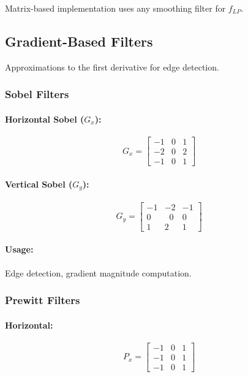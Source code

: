 \documentclass{AnantDocumentation}
\begin{document}
Matrix-based implementation uses any smoothing filter for $f_{LP}$.

\subsection{Gradient-Based Filters}

Approximations to the first derivative for edge detection.

\subsubsection{Sobel Filters}

\paragraph{Horizontal Sobel ($G_x$):}
\[
G_x =
\begin{bmatrix}
-1 & 0 & 1\\
-2 & 0 & 2\\
-1 & 0 & 1
\end{bmatrix}
\]

\paragraph{Vertical Sobel ($G_y$):}
\[
G_y =
\begin{bmatrix}
-1 & -2 & -1\\
0 & \;\;0 & 0\\
1 & 2 & 1
\end{bmatrix}
\]

\paragraph{Usage:}
Edge detection, gradient magnitude computation.

\subsubsection{Prewitt Filters}

\paragraph{Horizontal:}
\[
P_x =
\begin{bmatrix}
-1 & 0 & 1\\
-1 & 0 & 1\\
-1 & 0 & 1
\end{bmatrix}
\]
\end{document}
